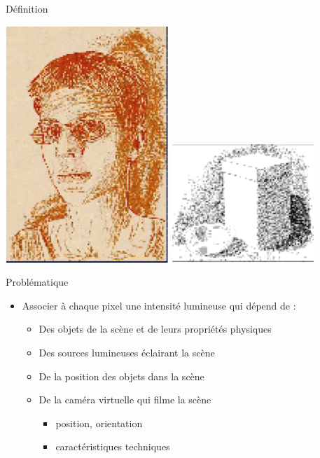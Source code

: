 \begin{frame}{Définition}
\begin{center}
\includegraphics[height=0.25\textheight]{figs/npr-points.png}
\hspace{0.1cm}
\includegraphics[height=0.25\textheight]{figs/npr-points2.png}
\end{center}

\end{frame}


\begin{frame}{Problématique}
\begin{itemize}
\item Associer à chaque pixel une intensité lumineuse qui dépend de :
\begin{itemize}
\item Des objets de la scène et de leurs propriétés physiques
\item Des sources lumineuses éclairant la scène
\item De la position des objets dans la scène
\item De la caméra virtuelle qui filme la scène
\begin{itemize}
\item position, orientation
\item caractéristiques techniques
\end{itemize}
\end{itemize}
\end{itemize}
\end{frame}

